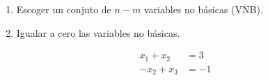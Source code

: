 \documentclass[../main.tex]{subfiles}
\begin{document}
        \begin{enumerate}
            \item Escoger un conjuto de $n-m$ variables no básicas (VNB).
            \item Igualar a cero las variables no básicas.
        \end{enumerate}

        \begin{example}
            \begin{equation}
                \begin{aligned}
                    x_1 + x_2 &= 3 \\
                    - x_2 + x_3 &= -1 \\
                \end{aligned}
            \end{equation}


\end{example}
\end{document}
